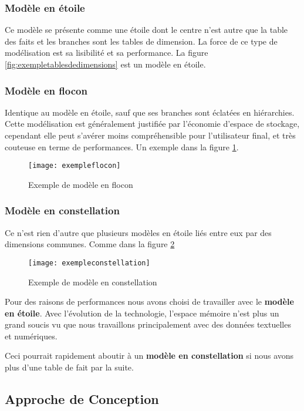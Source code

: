 \subsubsection{Modèle en étoile}
Ce modèle se présente comme une étoile dont le centre n’est autre que la table des faits et les branches sont les tables de dimension. La force de ce type de modélisation est sa lisibilité et sa performance. La figure \ref{fig:exempletablesdedimensions} est un modèle en étoile.

\subsubsection{Modèle en flocon}
Identique au modèle en étoile, sauf que ses branches sont éclatées en hiérarchies. Cette modélisation est généralement justifiée par l’économie d’espace de stockage, cependant elle peut s’avérer moins compréhensible pour l’utilisateur final, et très couteuse en terme de performances. Un exemple dans la figure \ref{fig:exempleflocon}.
\begin{figure}[H]
    \centering
    \texttt{[image: exempleflocon]}
    \caption{Exemple de modèle en flocon}
    \label{fig:exempleflocon}
\end{figure}

\subsubsection{Modèle en constellation}
Ce n’est rien d’autre que plusieurs modèles en étoile liés entre eux par des dimensions communes. Comme dans la figure \ref{fig:exempleconstellation}
\begin{figure}[H]
    \centering
    \texttt{[image: exempleconstellation]}
    \caption{Exemple de modèle en constellation}
    \label{fig:exempleconstellation}
\end{figure}

Pour des raisons de performances nous avons choisi de travailler avec le \textbf{modèle en étoile}. Avec l'évolution de la technologie, l'espace mémoire n'est plus un grand soucis vu que nous travaillons principalement avec des données textuelles et numériques.

Ceci pourrait rapidement aboutir à un \textbf{modèle en constellation} si nous avons plus d'une table de fait par la suite.

\subsection{Approche de Conception}

